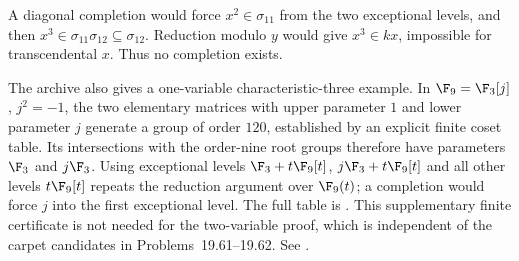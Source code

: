 A diagonal completion would force
\(x^2\in\sigma_{11}\) from the two exceptional levels, and then
\(x^3\in\sigma_{11}\sigma_{12}\subseteq\sigma_{12}\).
Reduction modulo \(y\) would give \(x^3\in kx\), impossible for
transcendental \(x\).
Thus no completion exists.

The archive also gives a one-variable characteristic-three example.
In \(\F_9=\F_3[j]\), \(j^2=-1\), the two elementary matrices with
upper parameter \(1\) and lower parameter \(j\) generate a group
of order \(120\), established by an explicit finite coset table.
Its intersections with the order-nine root groups therefore have
parameters \(\F_3\) and \(j\F_3\).
Using exceptional levels
\(\F_3+t\F_9[t]\), \(j\F_3+t\F_9[t]\) and all other levels
\(t\F_9[t]\) repeats the reduction argument over \(\F_9(t)\);
a completion would force \(j\) into the first exceptional level.
The full table is .
This supplementary finite certificate is not needed for the
two-variable proof, which is independent of the carpet candidates
in Problems~19.61--19.62.
See .

